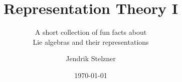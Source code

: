 \documentclass[a4paper,10pt,twoside=semi,openany]{scrbook}
\title{Representation Theory I}
\subtitle{A short collection of fun facts about \\ Lie algebras and their representations}
\author{Jendrik Stelzner}
\date{\today}
\begin{document}
\frontmatter
\maketitle

\tableofcontents

\mainmatter



\appendix
\addappheadtotoc
\appendixpage


\backmatter
\printbibliography
\end{document}
